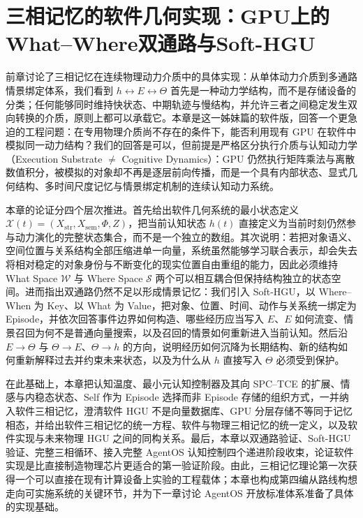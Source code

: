 \chapter{三相记忆的软件几何实现：GPU上的What--Where双通路与Soft-HGU}

\begin{chapterlead}
前章讨论了三相记忆在连续物理动力介质中的具体实现：从单体动力介质到多通路情景绑定体系，我们看到 \(h\leftrightarrow E\leftrightarrow\Theta\) 首先是一种动力学结构，而不是存储设备的分类；任何能够同时维持快状态、中期轨迹与慢结构，并允许三者之间稳定发生双向转换的介质，原则上都可以承载它。本章是这一姊妹篇的软件版，回答一个更急迫的工程问题：在专用物理介质尚不存在的条件下，能否利用现有 GPU 在软件中模拟同一动力结构？我们的回答是可以，但前提是严格区分执行介质与认知动力学（Execution Substrate \(\neq\) Cognitive Dynamics）：GPU 仍然执行矩阵乘法与离散数值积分，被模拟的对象却不再是逐层前向传播，而是一个具有内部状态、显式几何结构、多时间尺度记忆与情景绑定机制的连续认知动力系统。

本章的论证分四个层次推进。首先给出软件几何系统的最小状态定义 \(\mathcal{X}(t)=(X_{\mathrm{str}},X_{\mathrm{sem}},\Phi,Z)\)，把当前认知状态 \(h(t)\) 直接定义为当前时刻仍然参与动力演化的完整状态集合，而不是一个独立的数组。其次说明：若把对象语义、空间位置与关系结构全部压缩进单一向量，系统虽然能够学习联合表示，却会失去将相对稳定的对象身份与不断变化的现实位置自由重组的能力，因此必须维持 What Space \(\mathcal{W}\) 与 Where Space \(\mathcal{S}\) 两个可以相互耦合但保持结构独立的状态空间。进而指出双通路仍然不足以形成情景记忆：我们引入 Soft-HGU，以 Where--When 为 Key、以 What 为 Value，把对象、位置、时间、动作与关系统一绑定为 Episode，并依次回答事件边界如何构造、哪些经历应当写入 \(E\)、\(E\) 如何流变、情景召回为何不是普通向量搜索，以及召回的情景如何重新进入当前认知。然后沿 \(E\to\Theta\) 与 \(\Theta\to E\)、\(\Theta\to h\) 的方向，说明经历如何沉降为长期结构、新的结构如何重新解释过去并约束未来状态，以及为什么从 \(h\) 直接写入 \(\Theta\) 必须受到保护。

在此基础上，本章把认知温度、最小元认知控制器及其向 SPC--TCE 的扩展、情感与内稳态状态、Self 作为 Episode 选择而非 Episode 存储的组织方式，一并纳入软件三相记忆，澄清软件 HGU 不是向量数据库、GPU 分层存储不等同于记忆相态，并给出软件三相记忆的统一方程、软件与物理三相记忆的统一定义，以及软件实现与未来物理 HGU 之间的同构关系。最后，本章以双通路验证、Soft-HGU 验证、完整三相循环、接入完整 AgentOS 认知控制四个递进阶段收束，论证软件实现是比直接制造物理芯片更适合的第一验证阶段。由此，三相记忆理论第一次获得一个可以直接在现有计算设备上实验的工程载体；本章也构成第四编从路线构想走向可实施系统的关键环节，并为下一章讨论 AgentOS 开放标准体系准备了具体的实现基础。
\end{chapterlead}

